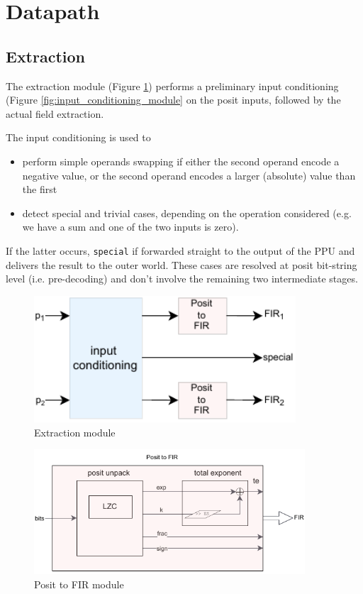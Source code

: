\section{Datapath}

\subsection{Extraction}\label{sec:posit_extraction}

The extraction module (Figure \ref{fig:extraction_ppu}) performs a preliminary input conditioning (Figure \ref{fig:input_conditioning_module} on the posit inputs, followed by the actual field extraction.

The input conditioning is used to 
\begin{itemize}
    \item perform simple operands swapping if either the second operand encode a negative value, or the second operand encodes a larger (absolute) value than the first 
    \item detect special and trivial cases, depending on the operation considered (e.g. we have a sum and one of the two inputs is zero).
\end{itemize} 

If the latter occurs, \texttt{special} if forwarded straight to the output of the PPU and delivers the result to the outer world. These cases are resolved at posit bit-string level (i.e. pre-decoding) and don't involve the remaining two intermediate stages.

\begin{figure}
    \centering
    \includegraphics[width=0.87\textwidth]{figures/extraction.drawio.pdf}
    \caption{Extraction module}
    \label{fig:extraction_ppu}
\end{figure}

\begin{figure}
    \centering
    \includegraphics[width=0.9\textwidth]{figures/posit2fir.drawio.pdf}
    \caption{Posit to FIR module}
    \label{fig:posit2fir_ppu}
\end{figure}






